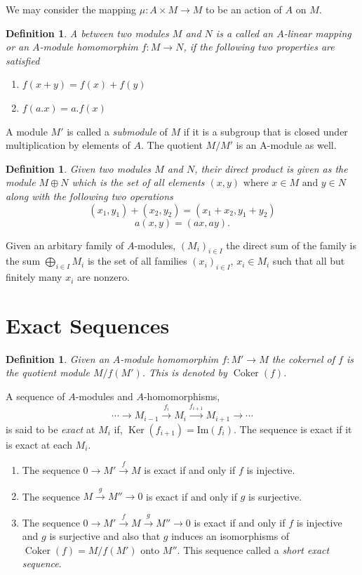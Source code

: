 \documentclass[]{report}
\newtheorem{defn}[theorem]{Definition}
\DeclareMathOperator\Ker{Ker}
\DeclareMathOperator\Coker{Coker}
\begin{document}
We may consider the mapping $\mu: A \times M \rightarrow M$ to be an action of $A$ on $M$.

\begin{defn}
    A  between two modules $M$ and $N$ is a called an $A$-\textit{linear mapping} or an $A$-module homomorphim $f:M\rightarrow N$, if the following two properties are satisfied
\begin{enumerate}
    \item $f(x+y) = f(x) + f(y)$
    \item $f(a.x) = a.f(x)$
\end{enumerate}
\end{defn}

A module $M'$ is called a \textit{submodule} of $M$ if it is a subgroup that is closed under multiplication by elements of $A$. The quotient $M/M'$ is an A-module as well.

\begin{defn}
    Given two modules $M$ and $N$, their direct product is given as the module $M\oplus N$ which is the set of all elements $(x,y) \text{ where } x\in M \text{ and } y\in N$ along with the following two operations 
$$(x_1,y_1) + (x_2,y_2) = (x_1+x_2, y_1+y_2)$$
$$a(x,y) = (ax, ay).$$
\end{defn}

Given an arbitary family of $A$-modules, $(M_i)_{i\in I}$ the direct sum of the family is the sum $\bigoplus_{i\in I} M_i$ is the set of all families $(x_i)_{i\in I}$, $x_i\in M_i$ such that all but finitely many $x_i$ are nonzero.

\section{Exact Sequences}

\begin{defn}
    Given an $A$-module homomorphim $f: M' \rightarrow M$ the cokernel of $f$ is the quotient module $M/f(M')$. This is denoted by $\Coker(f)$.
\end{defn}


A sequence of $A$-modules and $A$-homomorphisms,
$$\cdots \rightarrow M_{i-1} \xrightarrow{f_i} M_i \xrightarrow{f_{i+1}} M_{i+1} \rightarrow \cdots$$ 
is said to be \textit{exact} at $M_i$ if, $\Ker(f_{i+1}) = \text{Im}(f_i)$. The sequence is exact if it is exact at each $M_i$. 

\begin{enumerate}
    \item The sequence $0 \rightarrow M' \xrightarrow{f} M$ is exact if and only if $f$ is injective.
    \item The sequence $M \xrightarrow{g} M'' \rightarrow 0$ is exact if and only if $g$ is surjective. 
    \item The sequence $0 \rightarrow M' \xrightarrow{f} M \xrightarrow{g} M'' \rightarrow 0$ is exact if and only if $f$ is injective and $g$ is surjective and also that $g$ induces an isomorphisms of $\Coker(f) = M/f(M')$ onto $M''$. This sequence called a \textit{short exact sequence}.
\end{enumerate}
\end{document}

